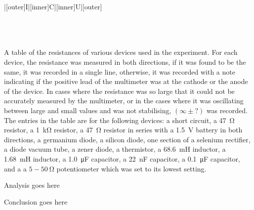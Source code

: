 \begin{paper}
{\begin{papertable}{|[outer]I|[inner]C|[inner]U|[outer]}
\papertableindex{}\\\paperiline
\papertableindex{}\\\paperiline
\papertableindex{}\\\paperiline
\papertableindex{}\\\paperoline
\end{papertable}\vspace{-1.5em}}
{A table of the resistances of various devices used in the experiment.
For each device, the resistance was measured in both directions, if it was found to be the same, it was recorded in a single line,
otherwise, it was recorded with a note indicating if the positive lead of the multimeter was at the cathode or the anode of the device.
In cases where the resistance was so large that it could not be accurately measured by the multimeter, or in the cases where it was oscillating between large and small values and was not stabilising, $(\infty\pm?)$ was recorded.
The entries in the table are for the following devices: a short circuit, a \SI{47}{\ohm} resistor, a \SI{1}{\kilo\ohm} resistor, a \SI{47}{\ohm} resistor in series with a \SI{1.5}{\volt} battery in both directions, a germanium diode, a silicon diode, one section of a selenium rectifier, a diode vacuum tube, a zener diode, a thermistor, a \SI{68.6}{\milli\henry} inductor, a \SI{1.68}{\milli\henry} inductor, a \SI{1.0}{\micro\farad} capacitor, a \SI{22}{\nano\farad} capacitor, a \SI{0.1}{\micro\farad} capacitor, and a a $5-\SI{50}{\ohm}$ potentiometer which was set to its lowest setting.}
	
	
	Analysis goes here
	

	Conclusion goes here
	


\end{paper}
